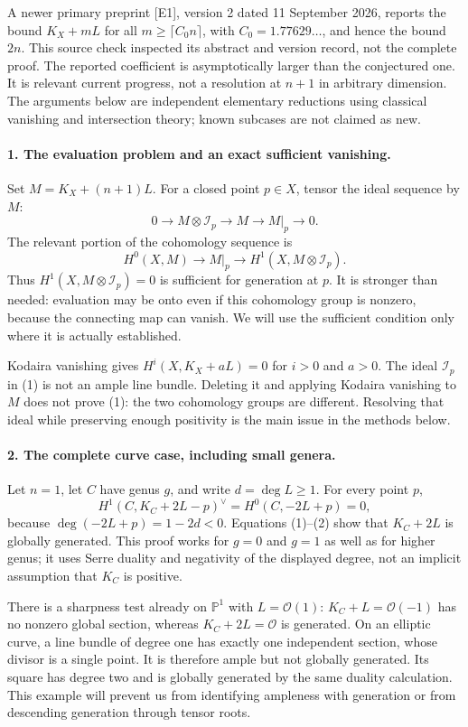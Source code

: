 \documentclass[11pt]{article}
\begin{document}
A newer primary preprint [E1], version 2 dated 11 September 2026, reports the bound $K_X+mL$ for all $m\ge\lceil C_0n\rceil$, with $C_0=1.77629\ldots$, and hence the bound $2n$. This source check inspected its abstract and version record, not the complete proof. The reported coefficient is asymptotically larger than the conjectured one. It is relevant current progress, not a resolution at $n+1$ in arbitrary dimension. The arguments below are independent elementary reductions using classical vanishing and intersection theory; known subcases are not claimed as new.

\paragraph{1. The evaluation problem and an exact sufficient vanishing.}
Set $M=K_X+(n+1)L$. For a closed point $p\in X$, tensor the ideal sequence by $M$:
\[
 0\longrightarrow M\otimes\mathcal I_p\longrightarrow M
 \longrightarrow M|_p\longrightarrow0.
\]
The relevant portion of the cohomology sequence is
\[
 H^0(X,M)\longrightarrow M|_p\longrightarrow
 H^1(X,M\otimes\mathcal I_p).                          \tag{1}
\]
Thus $H^1(X,M\otimes\mathcal I_p)=0$ is sufficient for generation at $p$. It is stronger than needed: evaluation may be onto even if this cohomology group is nonzero, because the connecting map can vanish. We will use the sufficient condition only where it is actually established.

Kodaira vanishing gives $H^i(X,K_X+aL)=0$ for $i>0$ and $a>0$. The ideal $\mathcal I_p$ in (1) is not an ample line bundle. Deleting it and applying Kodaira vanishing to $M$ does not prove (1): the two cohomology groups are different. Resolving that ideal while preserving enough positivity is the main issue in the methods below.

\paragraph{2. The complete curve case, including small genera.}
Let $n=1$, let $C$ have genus $g$, and write $d=\deg L\ge1$. For every point $p$,
\[
 H^1(C,K_C+2L-p)^{\vee}=H^0(C,-2L+p)=0,               \tag{2}
\]
because $\deg(-2L+p)=1-2d<0$. Equations (1)--(2) show that $K_C+2L$ is globally generated. This proof works for $g=0$ and $g=1$ as well as for higher genus; it uses Serre duality and negativity of the displayed degree, not an implicit assumption that $K_C$ is positive.

There is a sharpness test already on $\mathbb P^1$ with $L=\mathcal O(1)$: $K_C+L=\mathcal O(-1)$ has no nonzero global section, whereas $K_C+2L=\mathcal O$ is generated. On an elliptic curve, a line bundle of degree one has exactly one independent section, whose divisor is a single point. It is therefore ample but not globally generated. Its square has degree two and is globally generated by the same duality calculation. This example will prevent us from identifying ampleness with generation or from descending generation through tensor roots.
\end{document}
